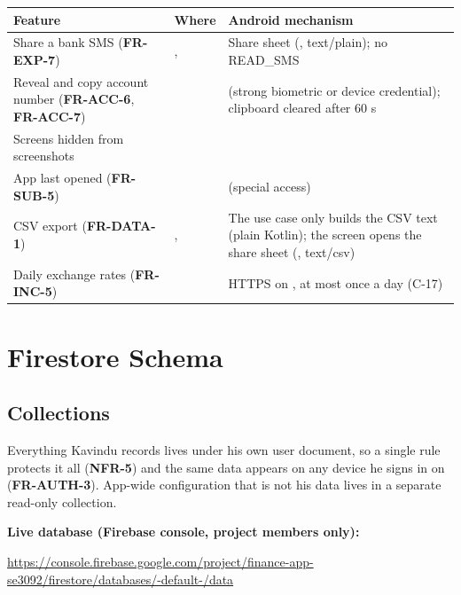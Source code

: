 \documentclass[11pt,a4paper]{article}
\newcommand{\linkline}[2]{\par\smallskip\noindent\textbf{#1:}\par\nopagebreak\noindent\url{#2}\par\smallskip}
\newcommand{\req}[1]{\textsf{\textbf{\color{pfgreendark}#1}}}
\begin{document}
\begin{tabularx}{\textwidth}{|>{\raggedright\arraybackslash}p{4.1cm}|>{\raggedright\arraybackslash}p{4cm}|L|}
\hline
\textbf{Feature} & \textbf{Where} & \textbf{Android mechanism}\\
\hline
Share a bank SMS (\req{FR-EXP-7}) & ,  & Share sheet (, text/plain); no READ\_SMS\\
Reveal and copy account number (\req{FR-ACC-6}, \req{FR-ACC-7}) &  &  (strong biometric or device credential); clipboard cleared after 60 s\\
Screens hidden from screenshots &  & \\
App last opened (\req{FR-SUB-5}) &  &  (special access)\\
CSV export (\req{FR-DATA-1}) & ,  & The use case only builds the CSV text (plain Kotlin); the screen opens the share sheet (, text/csv)\\
Daily exchange rates (\req{FR-INC-5}) &  & HTTPS on , at most once a day (C-17)\\
\hline
\end{tabularx}

\section{Firestore Schema}
\label{sec:schema}

\subsection{Collections}
Everything Kavindu records lives under his own user document, so a single rule protects it all (\req{NFR-5}) and the same data appears on any device he signs in on (\req{FR-AUTH-3}). App-wide configuration that is not his data lives in a separate read-only  collection.
\linkline{Live database (Firebase console, project members only)}{https://console.firebase.google.com/project/finance-app-se3092/firestore/databases/-default-/data}
\end{document}
